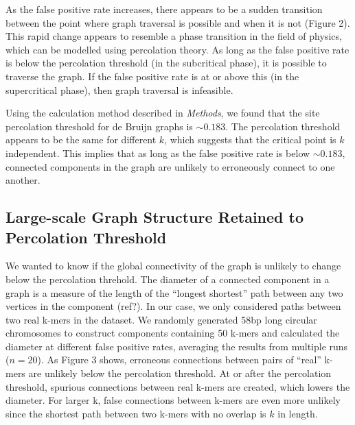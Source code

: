 \documentclass[12pt]{article} \usepackage{simplemargins}
\begin{document}
As the false positive rate increases, there appears to be a sudden
transition between the point where graph traversal is possible and
when it is not (Figure 2). This rapid change appears to resemble a phase transition in the
field of physics, which can be modelled using percolation theory. As
long as the false positive rate is below the percolation threshold (in
the subcritical phase), it is possible to traverse the graph. If the
false positive rate is at or above this (in the supercritical phase), then graph
traversal is infeasible.

Using the calculation method described in \emph{Methods}, we found that the 
site percolation threshold for de Bruijn graphs is $\sim0.183$. 
The percolation threshold appears to be the same for 
different $k$, which suggests that the 
critical point is $k$ independent. This implies that as long as the 
false positive rate is below $\sim 0.183$, connected components in the graph 
are unlikely to erroneously connect to one another.

\subsection{Large-scale Graph Structure Retained to Percolation Threshold}
We wanted to know if the global connectivity of the graph is unlikely 
to change below the percolation threhold. 
The diameter of a connected component in a graph is a measure of 
the length of the ``longest shortest'' 
path between any two vertices in the component (ref?).
In our case, we only considered paths between two real k-mers
in the dataset. 
We randomly generated 58bp long circular
chromosomes to construct components containing 50 k-mers and 
calculated the diameter at different false positive rates, averaging
the results from multiple runs ($n=20$).
As Figure 3 shows, 
erroneous connections between pairs of ``real'' k-mers are unlikely
below the 
percolation threshold. At or after the percolation threshold, spurious connections 
between real k-mers are created, which lowers the diameter. For larger k, false connections 
between k-mers are even more unlikely since the shortest path between two k-mers 
with no overlap is $k$ in length.
\end{document}
